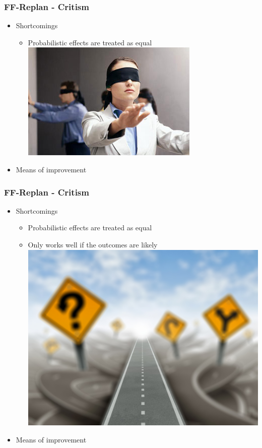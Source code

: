 \documentclass{beamer}
\let\origframetitle=\frametitle
\renewcommand\frametitle[1]{\origframetitle{\textbf{\large{\textrm{#1}}}}}
\begin{document}
\begin{frame}
  \frametitle{FF-Replan - Critism}

  \begin{itemize}
    \item Shortcomings
      \begin{itemize}
        \item Probabilistic effects are treated as equal
          \includegraphics[scale=0.5]{images/blindfold.jpg}
      \end{itemize}
    \item Means of improvement
  \end{itemize}
\end{frame}

\begin{frame}
  \frametitle{FF-Replan - Critism}

  \begin{itemize}
    \item Shortcomings
      \begin{itemize}
        \item Probabilistic effects are treated as equal
        \item Only works well if the outcomes are likely
          \includegraphics[scale=0.3]{images/direction-road-maze.jpg}
        \end{itemize}
    \item Means of improvement
  \end{itemize}
\end{frame}
\end{document}
